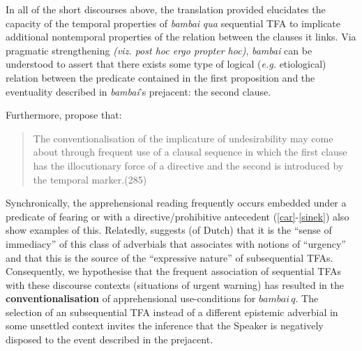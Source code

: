 \documentclass[11pt]{article}
\begin{document}
In all of the short discourses above, the translation provided elucidates the capacity of the temporal properties of \textit{bambai} \textit{qua} sequential TFA to implicate additional nontemporal properties of the relation between the clauses it links. Via pragmatic strengthening \textit{(viz. post hoc ergo propter hoc)}, \textit{bambai} can be understood to assert that there exists some type of logical (\textit{e.g.} etiological) relation between the predicate contained in the first proposition and the  eventuality described in \textit{bambai}'s prejacent: the second clause.%





Furthermore, \citet{Angelo2016} propose that:
\begin{quotation}
{\small
	The conventionalisation of the implicature of undesirability may come about through frequent use of a clausal sequence in which the first clause has the illocutionary force of a directive and the second is introduced by the temporal marker.\hfill(285)}\end{quotation} 

Synchronically, the apprehensional reading frequently occurs embedded under a predicate of fearing or with a directive/prohibitive antecedent (\ref{car}-\ref{sinek}) also show examples of this.  Relatedly, \citet[192\textit{ff}]{Boogaart2020} suggests (of Dutch) that it is the ``sense of immediacy'' of this class of adverbials that associates with notions of ``urgency'' and that this is the source of the ``expressive nature'' of subsequential TFAs. Consequently, we hypothesise that the frequent association of sequential TFAs with these discourse contexts (situations of urgent warning) has resulted in the \textbf{conventionalisation} of apprehensional use-conditions for $\textit{bambai}\,q$. The selection of an subsequential TFA instead of a different epistemic adverbial in some unsettled context invites the inference that the Speaker is negatively disposed to the event described in the prejacent.
\end{document}
